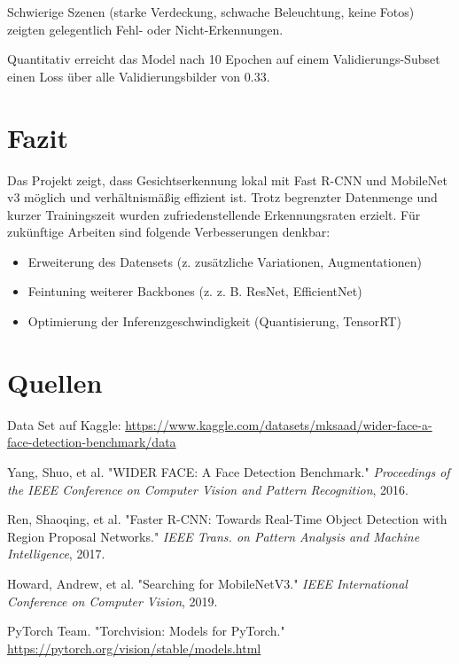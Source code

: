 \documentclass[11pt,a4paper]{article}
\begin{document}
Schwierige Szenen (starke Verdeckung, schwache Beleuchtung, keine Fotos) zeigten gelegentlich Fehl- oder Nicht-Erkennungen.


Quantitativ erreicht das Model nach 10 Epochen auf einem Validierungs-Subset einen Loss über alle Validierungsbilder von 0.33.

\section{Fazit}
Das Projekt zeigt, dass Gesichtserkennung lokal mit Fast R-CNN und MobileNet v3 möglich und verhältnismäßig effizient ist. Trotz begrenzter Datenmenge und kurzer Trainingszeit wurden zufriedenstellende Erkennungsraten erzielt. Für zukünftige Arbeiten sind folgende Verbesserungen denkbar:
\begin{itemize}
\item Erweiterung des Datensets (z. zusätzliche Variationen, Augmentationen)
\item Feintuning weiterer Backbones (z. z. B. ResNet, EfficientNet)
\item Optimierung der Inferenzgeschwindigkeit (Quantisierung, TensorRT)
\end{itemize}

\section{Quellen}
Data Set auf Kaggle: \url{https://www.kaggle.com/datasets/mksaad/wider-face-a-face-detection-benchmark/data}

\begin{thebibliography}{9}
 Yang, Shuo, et al. "WIDER FACE: A Face Detection Benchmark." \emph{Proceedings of the IEEE Conference on Computer Vision and Pattern Recognition}, 2016.

 Ren, Shaoqing, et al. "Faster R-CNN: Towards Real-Time Object Detection with Region Proposal Networks." \emph{IEEE Trans. on Pattern Analysis and Machine Intelligence}, 2017.

 Howard, Andrew, et al. "Searching for MobileNetV3." \emph{IEEE International Conference on Computer Vision}, 2019.

 PyTorch Team. "Torchvision: Models for PyTorch." \url{https://pytorch.org/vision/stable/models.html}
\end{thebibliography}
\end{document}
